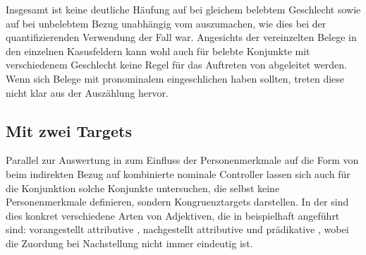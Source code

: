 Insgesamt ist keine deutliche Häufung auf  bei gleichem
belebtem Geschlecht sowie auf  bei
unbelebtem Bezug unabhängig vom  auszumachen, wie dies
bei der quantifizierenden Verwendung der Fall war. Angesichts der vereinzelten
Belege in den einzelnen Kasusfeldern kann wohl auch für belebte Konjunkte mit
verschiedenem Geschlecht keine Regel für das Auftreten von
 abgeleitet werden. Wenn sich Belege mit pronominalem 
eingeschlichen haben sollten, treten diese nicht klar aus der Auszählung
hervor.


\subsection{Mit zwei Targets}
\label{subsec:caobeidkoordtarg}

Parallel zur Auswertung in  zum Einfluss
der Personenmerkmale auf die Form von  beim
indirekten Bezug auf kombinierte nominale Controller lassen sich auch für die
Konjunktion  solche Konjunkte untersuchen, die selbst keine
Personenmerkmale definieren, sondern Kongruenz\-targets darstellen. In der
 sind dies konkret verschiedene Arten von Adjektiven, die in
 beispielhaft angeführt sind: vorangestellt
attributive , nachgestellt
attributive  und prädikative
, wobei die Zuordung bei
Nachstellung nicht immer eindeutig ist.

